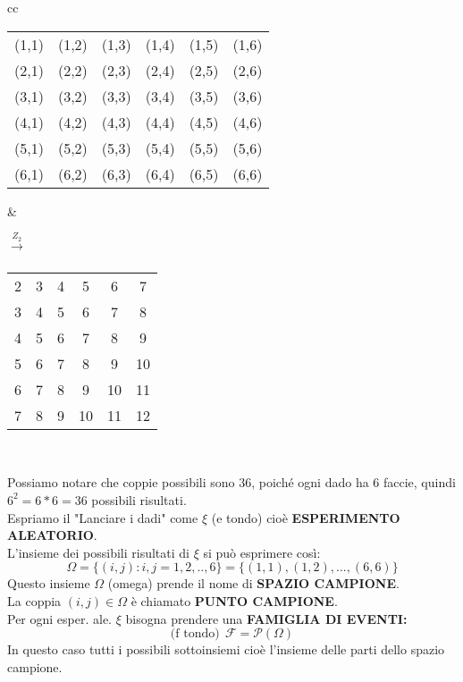 \begin{center}
\begin{tabular}{ cc }

\begin{tabular}{ |c|c|c|c|c|c| } 
 \hline
 (1,1) & (1,2) & (1,3) & (1,4) & (1,5) & (1,6) \\ 
 (2,1) & (2,2) & (2,3) & (2,4) & (2,5) & (2,6) \\ 
 (3,1) & (3,2) & (3,3) & (3,4) & (3,5) & (3,6) \\ 
 (4,1) & (4,2) & (4,3) & (4,4) & (4,5) & (4,6) \\ 
 (5,1) & (5,2) & (5,3) & (5,4) & (5,5) & (5,6) \\ 
 (6,1) & (6,2) & (6,3) & (6,4) & (6,5) & (6,6) \\ 
 \hline
\end{tabular} &

$\xrightarrow[]{Z_2}$

\begin{tabular}{ |c|c|c|c|c|c| } 
 \hline
 2 & 3 & 4 & 5 & 6 & 7 \\ 
 3 & 4 & 5 & 6 & 7 & 8 \\ 
 4 & 5 & 6 & 7 & 8 & 9 \\ 
 5 & 6 & 7 & 8 & 9 & 10 \\ 
 6 & 7 & 8 & 9 & 10 & 11 \\ 
 7 & 8 & 9 & 10 & 11 & 12 \\ 
 \hline
\end{tabular}\\

\end{tabular}
\end{center}
Possiamo notare che coppie possibili sono 36, poiché ogni dado ha 6 faccie, quindi $6^2=6*6=36$ possibili risultati.\\
Espriamo il "Lanciare i dadi" come $\xi$ (e tondo) cioè \textbf{ESPERIMENTO ALEATORIO}.\\
L'insieme dei possibili risultati di $\xi$ si può esprimere così: 
$$ \Omega=\{(i,j):i,j=1,2,..,6\}=\{(1,1), (1,2), ..., (6,6)\} $$
Questo insieme $\Omega$ (omega) prende il nome di \textbf{SPAZIO CAMPIONE}.\\
La coppia $ (i,j) \in \Omega $ è chiamato \textbf{PUNTO CAMPIONE}.\\  
Per ogni esper. ale. $\xi$ bisogna prendere una \textbf{FAMIGLIA DI EVENTI:} 
$$\text{(f tondo)}\:\:\mathcal{F} = \mathcal{P}(\Omega)$$
In questo caso tutti i possibili sottoinsiemi cioè l'insieme delle parti dello spazio campione. \\

